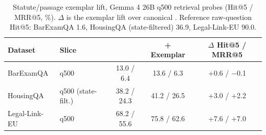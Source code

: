 \begin{table}[H]
\centering
\caption{Statute/passage exemplar lift, Gemma 4 26B q500 retrieval probes (Hit@5 / MRR@5, \%). $\Delta$ is the exemplar lift over canonical \hyre{}. Reference raw-question Hit@5: BarExamQA 1.6, HousingQA (state-filtered) 36.9, Legal-Link-EU 90.0.}
\label{tab:exemplar_probe}
\footnotesize
\begin{tabular}{llccc}
\toprule
Dataset & Slice & \hyre{} & + Exemplar & $\Delta$ Hit@5 / MRR@5 \\
\midrule
BarExamQA & q500 & 13.0 / 6.4 & 13.6 / 6.3 & +0.6 / $-$0.1 \\
HousingQA & q500 (state-filt.) & 38.2 / 24.3 & 41.2 / 26.5 & +3.0 / +2.2 \\
Legal-Link-EU & q500 & 68.2 / 55.6 & 75.8 / 62.6 & +7.6 / +7.0 \\
\bottomrule
\end{tabular}
\end{table}
